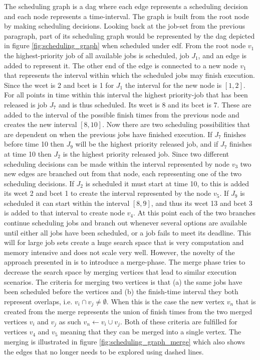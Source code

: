 \documentclass{kththesis}
\begin{document}
The scheduling graph is a \acrshort{dag} where each edge represents a scheduling decision and each
node represents a time-interval. The graph is built from the root node by making scheduling
decisions. Looking back at the job-set from the previous paragraph, part of its scheduling graph
would be represented by the \acrshort{dag} depicted in figure \ref{fig:scheduling_graph} when
scheduled under \acrshort{edf}. From the root node $v_1$ the highest-priority job of all available
jobs is scheduled, job $J_1$, and an edge is added to represent it. The other end of the edge is
connected to a new node $v_1$ that represents the interval within which the scheduled jobs may
finish execution. Since the \acrshort{wcet} is 2 and \acrshort{bcet} is 1 for $J_1$ the interval for
the new node is $[1, 2]$. For all points in time within this interval the highest priority-job that
has been released is job $J_7$ and is thus scheduled. Its \acrshort{wcet} is 8 and its
\acrshort{bcet} is 7.  These are added to the interval of the possible finish times from the
previous node and creates the new interval $[8,10]$. Now there are two scheduling possibilities that
are dependent on when the previous jobs have finished execution. If $J_7$ finishes before time 10
then $J_9$ will be the highest priority released job, and if $J_7$ finishes at time 10 then $J_2$ is
the highest priority released job. Since two different scheduling decisions can be made within the
interval represented by node $v_3$ two new edges are branched out from that node, each representing
one of the two scheduling decisions. If $J_2$ is scheduled it must start at time 10, to this is
added its \acrshort{wcet} 2 and \acrshort{bcet} 1 to create the interval represented by the node
$v_5$. If $J_9$ is scheduled it can start within the interval $[8, 9]$, and thus its \acrshort{wcet}
13 and \acrshort{bcet} 3 is added to that interval to create node $v_4$. At this point each of the
two branches continue scheduling jobs and branch out whenever several options are available until
either all jobs have been scheduled, or a job fails to meet its deadline. This will for large job
sets create a huge search space that is very computation and memory intensive and does not scale
very well. However, the novelty of the approach presented in \parencite{nasri_exact_2017} is to
introduce a merge-phase. The merge phase tries to decrease the search space by merging vertices that
lead to similar execution scenarios. The criteria for merging two vertices is that (a) the same jobs
have been scheduled before the vertices and (b) the finish-time interval they both represent
overlaps, i.e. $v_i \cap v_j \neq \emptyset$.  When this is the case the new vertex $v_n$ that is
created from the merge represents the union of finish times from the two merged vertices $v_i$ and
$v_j$ as such $v_n \gets v_i \cup v_j$. Both of these criteria are fulfilled for vertices $v_4$ and
$v_5$ meaning that they can be merged into a single vertex. The merging is illustrated in figure
\ref{fig:scheduling_graph_merge} which also shows the edges that no longer needs to be explored
using dashed lines.
\end{document}
